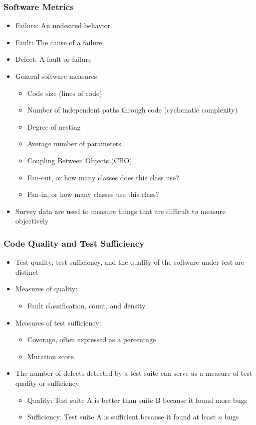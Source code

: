 \documentclass{beamer}
\begin{document}
\begin{frame}
\frametitle{Software Metrics}
\begin{itemize}
	\item Failure: An undesired behavior
	\item Fault: The cause of a failure
	\item Defect: A fault or failure
	\item General software measures:
	\begin{itemize}
		\item Code size (lines of code)
		\item Number of independent paths through code (cyclomatic complexity)
		\item Degree of nesting
		\item Average number of parameters
		\item Coupling Between Objects (CBO)
		\item Fan-out, or how many classes does this class use?
		\item Fan-in, or how many classes use this class?
	\end{itemize}
	\item Survey data are used to measure things that are difficult to measure objectively
	\end{itemize}
\end{frame}

\begin{frame}
\frametitle{Code Quality and Test Sufficiency}
	\begin{itemize}
	\item Test quality, test sufficiency, and the quality of the software under test are distinct
	\item Measures of quality:
	\begin{itemize}
		\item Fault classification, count, and density
	\end{itemize}
	\item Measures of test sufficiency:
	\begin{itemize}
		\item Coverage, often expressed as a percentage
		\item Mutation score
	\end{itemize}
	\item The number of defects detected by a test suite can serve as a measure of test quality or sufficiency
	\begin{itemize}
		\item Quality: Test suite A is better than suite B because it found more bugs
		\item Sufficiency: Test suite A is sufficient because it found at least $n$ bugs
	\end{itemize}
	\end{itemize}
\end{frame}
\end{document}
